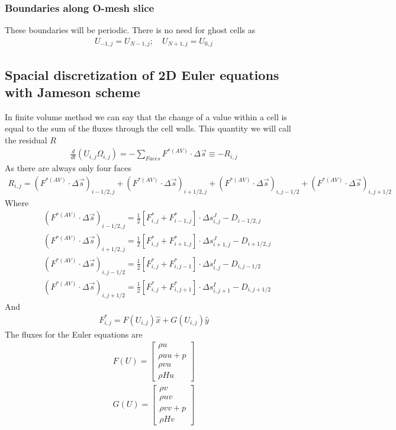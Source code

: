 \documentclass[11pt]{article}
\begin{document}
		\subsubsection{Boundaries along O-mesh slice}
		These boundaries will be periodic. There is no need for ghost cells as
			\begin{align}
			U_{-1,j} = U_{N-1,j}; \quad U_{N+1,j} = U_{0,j}
			\end{align}
	\subsection{Spacial discretization of 2D Euler equations with Jameson scheme}
	In finite volume method we can say that the change of a value within a cell is equal to the sum of the fluxes through the cell walls.  This quantity we will call the residual $R$
		\begin{align}
		\frac{d}{dt} (U_{i,j}\Omega_{i,j}) = -\sum_{Faces} F^{*(AV)} \cdot \Delta \vec s \equiv -R_{i,j}
		\end{align}
	As there are always only four faces
		\begin{align}
		R_{i,j} = (F^{*(AV)} \cdot \Delta \vec s)_{i-1/2,j} + (F^{*(AV)} \cdot \Delta \vec s)_{i+1/2,j} + (F^{*(AV)} \cdot \Delta \vec s)_{i,j-1/2} + (F^{*(AV)} \cdot \Delta \vec s)_{i,j+1/2}
		\end{align}
	Where
		\begin{align}
		&(F^{*(AV)} \cdot \Delta \vec s)_{i-1/2,j} = \frac{1}{2} \left[F_{i,j}^* + F_{i-1,j}^* \right] \cdot \Delta s_{i,j}^J - D_{i-1/2,j} \\
		&(F^{*(AV)} \cdot \Delta \vec s)_{i+1/2,j} = \frac{1}{2} \left[F_{i,j}^* + F_{i+1,j}^* \right] \cdot \Delta s_{i+1,j}^J - D_{i+1/2,j} \\
		&(F^{*(AV)} \cdot \Delta \vec s)_{i,j-1/2} = \frac{1}{2} \left[F_{i,j}^* + F_{i,j-1}^* \right] \cdot \Delta s_{i,j}^I - D_{i,j-1/2} \\
		&(F^{*(AV)} \cdot \Delta \vec s)_{i,j+1/2} = \frac{1}{2} \left[F_{i,j}^* + F_{i,j+1}^* \right] \cdot \Delta s_{i,j+1}^I - D_{i,j+1/2}
		\end{align}
	And
		\begin{align}
		F_{i,j}^* = F(U_{i,j})\hat{x} + G(U_{i,j})\hat{y}
		\end{align}
	The fluxes for the Euler equations are
		\begin{align}
		F(U) = \begin{bmatrix}
		\rho u \\ \rho uu + p\\ \rho vu \\ \rho H u
		\end{bmatrix} \\
		G(U) = \begin{bmatrix}
		\rho v \\ \rho uv \\ \rho vv + p\\ \rho H v
		\end{bmatrix}
		\end{align}
\end{document}
